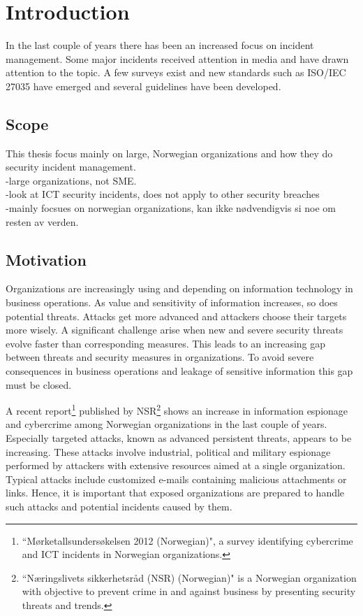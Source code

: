 \chapter{Introduction}
In the last couple of years there has been an increased focus on incident management. Some major incidents received attention in media and have drawn attention to the topic. A few surveys exist and new standards such as ISO/IEC 27035 have emerged and several guidelines have been developed.

\section{Scope}
This thesis focus mainly on large, Norwegian organizations and how they do security incident management.\\

-large organizations, not SME.\\
-look at ICT security incidents, does not apply to other security breaches\\
-mainly focsues on norwegian organizations, kan ikke nødvendigvis si noe om resten av verden.

\section{Motivation}
Organizations are increasingly using and depending on information technology in business operations. As value and sensitivity of information increases, so does potential threats. Attacks get more advanced and attackers choose their targets more wisely. A significant challenge arise when new and severe security threats evolve faster than corresponding measures. This leads to an increasing gap between threats and security measures in organizations. To avoid severe consequences in business operations and leakage of sensitive information this gap must be closed.

A recent report\footnote{``Mørketallsundersøkelsen 2012 (Norwegian)", a survey identifying cybercrime and ICT incidents in Norwegian organizations.} published by NSR\footnote{``Næringslivets sikkerhetsråd (NSR) (Norwegian)" is a Norwegian organization with objective to prevent crime in and against business by presenting security threats and trends.} shows an increase in information espionage and cybercrime among Norwegian organizations in the last couple of years\cite{Morketall2012}. Especially targeted attacks, known as advanced persistent threats, appears to be increasing. These attacks involve industrial, political and military espionage performed by attackers with extensive resources aimed at a single organization. Typical attacks include customized e-mails containing malicious attachments or links. Hence, it is important that exposed organizations are prepared to handle such attacks and potential incidents caused by them. 

